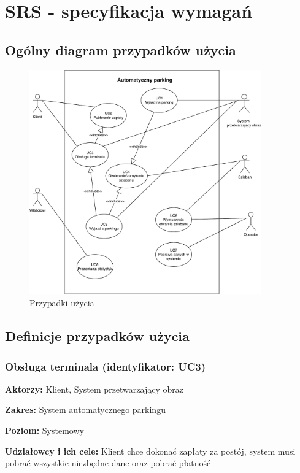 \chapter{SRS - specyfikacja wymagań}

\section{Ogólny diagram przypadków użycia}

\begin{figure}[H]
	\centering
	\includegraphics[width=100mm]{diagramy/PrzypUzycia.pdf}
	\caption{Przypadki użycia \label{overflow}}
\end{figure}

\section{Definicje przypadków użycia}
\subsection{Obsługa terminala (identyfikator: UC3)}
\textbf{Aktorzy: }Klient, System przetwarzający obraz

\hspace{0cm}\textbf{Zakres: }System automatycznego parkingu

\hspace{0cm}\textbf{Poziom: }Systemowy

\hspace{0cm}\textbf{Udziałowcy i ich cele: }Klient chce dokonać zapłaty za postój, system musi pobrać wszystkie niezbędne dane oraz pobrać płatność

